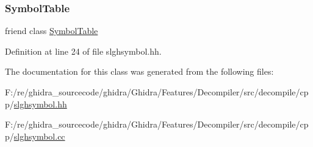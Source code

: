 \subsubsection{\texorpdfstring{SymbolTable}{SymbolTable}}
{\footnotesize\ttfamily friend class \mbox{\hyperlink{class_symbol_table}{Symbol\+Table}}\hspace{0.3cm}{\ttfamily [friend]}}



Definition at line 24 of file slghsymbol.\+hh.



The documentation for this class was generated from the following files\+:\begin{DoxyCompactItemize}
\item 
F\+:/re/ghidra\+\_\+sourcecode/ghidra/\+Ghidra/\+Features/\+Decompiler/src/decompile/cpp/\mbox{\hyperlink{slghsymbol_8hh}{slghsymbol.\+hh}}\item 
F\+:/re/ghidra\+\_\+sourcecode/ghidra/\+Ghidra/\+Features/\+Decompiler/src/decompile/cpp/\mbox{\hyperlink{slghsymbol_8cc}{slghsymbol.\+cc}}\end{DoxyCompactItemize}
